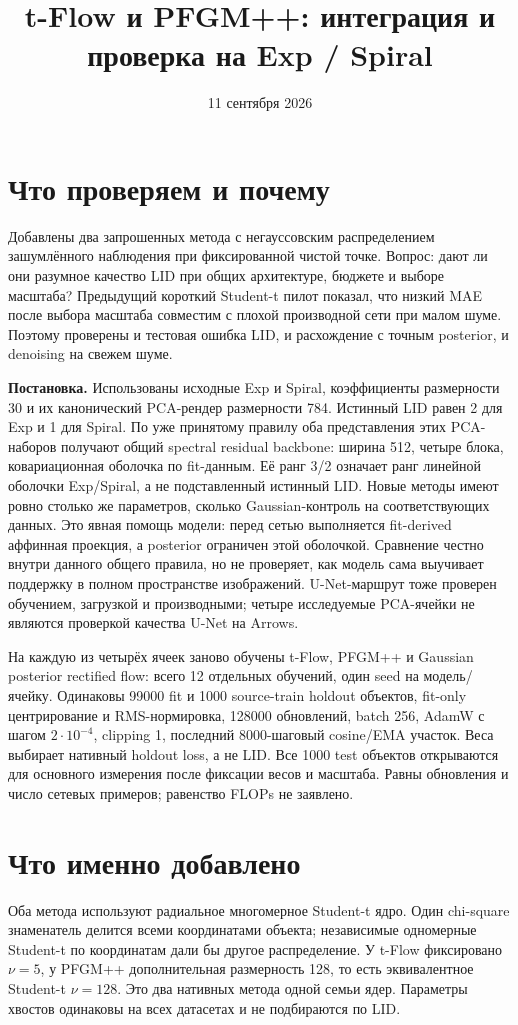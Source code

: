 \documentclass[10pt,a4paper]{article}
\title{t-Flow и PFGM++: интеграция и проверка на Exp / Spiral}
\author{}
\date{11 сентября 2026}
\begin{document}
\maketitle
\vspace{-12mm}

\section*{Что проверяем и почему}
Добавлены два запрошенных метода с негауссовским распределением зашумлённого
наблюдения при фиксированной чистой точке. Вопрос: дают ли они разумное качество
LID при общих архитектуре, бюджете и выборе масштаба? Предыдущий короткий
Student-t пилот показал, что низкий MAE после выбора масштаба совместим с плохой
производной сети при малом шуме. Поэтому проверены и тестовая ошибка LID,
и расхождение с точным posterior, и denoising на свежем шуме.

\textbf{Постановка.} Использованы исходные Exp и Spiral, коэффициенты размерности 30
и их канонический PCA-рендер размерности 784. Истинный LID равен 2 для Exp и 1 для
Spiral. По уже принятому правилу оба представления этих PCA-наборов получают
общий spectral residual backbone: ширина 512, четыре блока, ковариационная
оболочка по fit-данным. Её ранг 3/2 означает ранг линейной оболочки Exp/Spiral,
а не подставленный истинный LID. Новые методы имеют ровно столько же параметров,
сколько Gaussian-контроль на соответствующих данных. Это явная помощь модели:
перед сетью выполняется fit-derived аффинная проекция, а posterior ограничен
этой оболочкой. Сравнение честно внутри данного общего правила, но не проверяет,
как модель сама выучивает поддержку в полном пространстве изображений.
U-Net-маршрут тоже
проверен обучением, загрузкой и производными; четыре исследуемые PCA-ячейки
не являются проверкой качества U-Net на Arrows.

На каждую из четырёх ячеек заново обучены t-Flow, PFGM++ и Gaussian posterior
rectified flow: всего 12 отдельных обучений, один seed на модель/ячейку.
Одинаковы 99000 fit и 1000 source-train holdout объектов, fit-only центрирование и
RMS-нормировка, 128000 обновлений, batch 256, AdamW с шагом $2\cdot10^{-4}$,
clipping 1, последний 8000-шаговый cosine/EMA участок.
Веса выбирает нативный holdout loss, а не LID.
Все 1000 test объектов открываются для основного измерения после фиксации весов
и масштаба. Равны обновления и число сетевых примеров; равенство FLOPs не заявлено.

\section*{Что именно добавлено}
Оба метода используют радиальное многомерное Student-t ядро. Один chi-square
знаменатель делится всеми координатами объекта; независимые одномерные Student-t
по координатам дали бы другое распределение. У t-Flow фиксировано $\nu=5$,
у PFGM++ дополнительная размерность 128, то есть эквивалентное Student-t $\nu=128$.
Это два нативных метода одной семьи ядер. Параметры хвостов одинаковы на всех
датасетах и не подбираются по LID.
\end{document}
